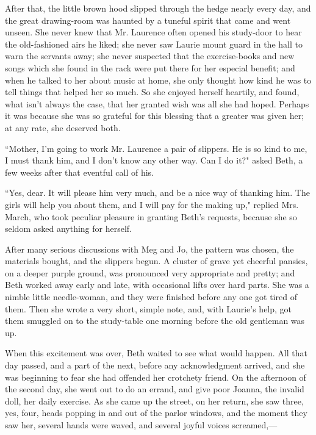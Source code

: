 After that, the little brown hood slipped through the hedge nearly every
day, and the great drawing-room was haunted by a tuneful spirit that
came and went unseen. She never knew that Mr. Laurence often opened his
study-door to hear the old-fashioned airs he liked; she never saw Laurie
mount guard in the hall to warn the servants away; she never suspected
that the exercise-books and new songs which she found in the rack were
put there for her especial benefit; and when he talked to her about
music at home, she only thought how kind he was to tell things that
helped her so much. So she enjoyed herself heartily, and found, what
isn't always the case, that her granted wish was all she
had hoped. Perhaps it was because she was so grateful for this blessing
that a greater was given her; at any rate, she deserved both.

``Mother, I'm going to work Mr. Laurence a pair of
slippers. He is so kind to me, I must thank him, and I
don't know any other way. Can I do it?" asked Beth, a
few weeks after that eventful call of his.

``Yes, dear. It will please him very much, and be a nice way of thanking
him. The girls will help you about them, and I will pay for the making
up," replied Mrs. March, who took peculiar pleasure in granting
Beth's requests, because she so seldom asked anything
for herself.

After many serious discussions with Meg and Jo, the pattern was chosen,
the materials bought, and the slippers begun. A cluster of grave yet
cheerful pansies, on a deeper purple ground, was pronounced very
appropriate and pretty; and Beth worked away early and late, with
occasional lifts over hard parts. She was a nimble little needle-woman,
and they were finished before any one got tired of them. Then she wrote
a very short, simple note, and, with Laurie's help, got
them smuggled on to the study-table one morning before the old gentleman
was up.

When this excitement was over, Beth waited to see what would happen. All
that day passed, and a part of the next, before any acknowledgment
arrived, and she was beginning to fear she had offended her crotchety
friend. On the afternoon of the second day, she went out to do an
errand, and give poor Joanna, the invalid doll, her daily exercise. As
she came up the street, on her return, she saw three, yes, four, heads
popping in and out of the parlor windows, and the moment they saw her,
several hands were waved, and several joyful voices screamed,---


